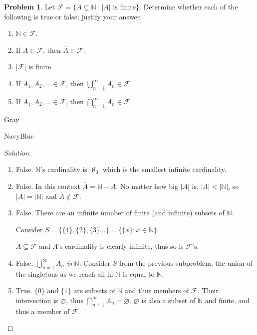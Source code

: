 \documentclass[12pt]{amsart}
\newcounter{problem_number}[section]
\theoremstyle{named}
\newenvironment{soln}
{\begin{color}{Gray}\begin{framed}\begin{color}{NavyBlue}\begin{proof}[Solution]
\doublespacing}
{\end{proof}\end{color}\end{framed}\end{color}}
\theoremstyle{definition}
\newtheorem{problem}{Problem}
\newcommand{\N}{\mathbb N}
\newcommand{\Ff}{\mathcal F}
\begin{document}
\begin{problem}
	Let $\Ff = \{A\subseteq\N\,:\,|A| \text{ is finite}\}$.
	Determine whether each of the following is true or false; justify your answer.
	\begin{enumerate}
		\item $\N\in\Ff$.
		\item If $A\in\Ff$, then $\overline A\in\Ff$.
		\item $|\Ff|$ is finite.
		\item If $A_1, A_2,\ldots \in\Ff$, then $\displaystyle\bigcup_{n=1}^\infty A_n\in\Ff$.
		\item If $A_1, A_2,\ldots \in\Ff$, then $\displaystyle\bigcap_{n=1}^\infty A_n\in\Ff$.
	\end{enumerate}
	
\end{problem}

\begin{soln}
	\phantom{ }
	\begin{enumerate}
		\item False. $\mathbb N$'s cardinality is $\aleph_0$ which is the smallest infinite cardinality.
		\item False. In this context $\overline{A} = \mathbb N - A$. No matter how big $|A|$ is, $|A|
		< |\mathbb N|$, so $|A| = |\mathbb N|$ and $\overline{A} \notin \mathcal F$.
		\item False. There are an infinite number of finite (and infinite) subsets of $\mathbb N$. 
		
		\noindent Consider $S = \{\{1\},\{2\},\{3\}\dots\} = \{\{x\}: x \in \mathbb N\}$.

		\noindent $A \subseteq \mathcal F$ and $A$'s cardinality is clearly infinite, thus so is
		$\mathcal F$'s. 

		\item False. $\displaystyle\bigcup_{n=1}^\infty A_n$ \textit{is} $\mathbb N$. Consider $S$
		from the previous subproblem, the union of the singletons as we reach all in $\mathbb N$ is
		equal to $\mathbb N$. 
		
		\item True. $\{0\}$ and $\{1\}$ are subsets of $\mathbb N$ and thus members of $\mathcal F$.
		Their intersection is $\varnothing$, thus $\displaystyle\bigcap_{n=1}^\infty A_n = \varnothing$.
		$\varnothing$ is also a subset of $\mathbb N$ and finite, and thus a member of $\mathcal F$.  
	\end{enumerate}
\end{soln}
\end{document}
